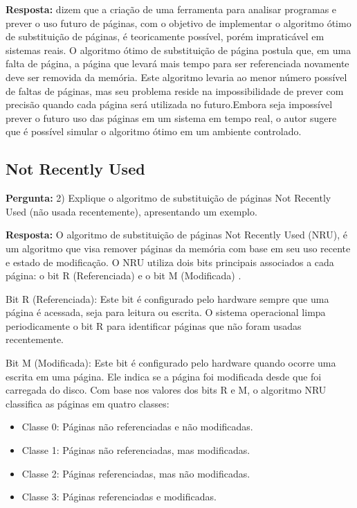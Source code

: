 \documentclass{article}
\begin{document}
\textbf{Resposta:}  \textcite[p. 144]{tanenbaum2021} dizem que a criação de uma ferramenta para analisar programas e prever o uso futuro de páginas, com o objetivo de implementar o algoritmo ótimo de substituição de páginas, é teoricamente possível, porém impraticável em sistemas reais. O algoritmo ótimo de substituição de página postula que, em uma falta de página, a página que levará mais tempo para ser referenciada novamente deve ser removida da memória. Este algoritmo levaria ao menor número possível de faltas de páginas, mas seu problema reside na impossibilidade de prever com precisão quando cada página será utilizada no futuro.Embora seja impossível prever o futuro uso das páginas em um sistema em tempo real, o autor sugere que é possível simular o algoritmo ótimo em um ambiente controlado.


\subsection{Not Recently Used}

\textbf{Pergunta:} 2) Explique o algoritmo de substituição de páginas Not Recently Used (não usada recentemente), apresentando um exemplo. \newline

\textbf{Resposta:}  O algoritmo de substituição de páginas Not Recently Used (NRU), é um algoritmo que visa remover páginas da memória com base em seu uso recente e estado de modificação. O NRU utiliza dois bits principais associados a cada página: o bit R (Referenciada) e o bit M (Modificada) \parencite[p. 145]{tanenbaum2021}.

Bit R (Referenciada): Este bit é configurado pelo hardware sempre que uma página é acessada, seja para leitura ou escrita. O sistema operacional limpa periodicamente o bit R para identificar páginas que não foram usadas recentemente.

Bit M (Modificada): Este bit é configurado pelo hardware quando ocorre uma escrita em uma página. Ele indica se a página foi modificada desde que foi carregada do disco. Com base nos valores dos bits R e M, o algoritmo NRU classifica as páginas em quatro classes:

\begin{itemize}
    
    \item Classe 0: Páginas não referenciadas e não modificadas.
    \item Classe 1: Páginas não referenciadas, mas modificadas.
    \item Classe 2: Páginas referenciadas, mas não modificadas.
    \item Classe 3: Páginas referenciadas e modificadas.
\end{itemize}
\end{document}
